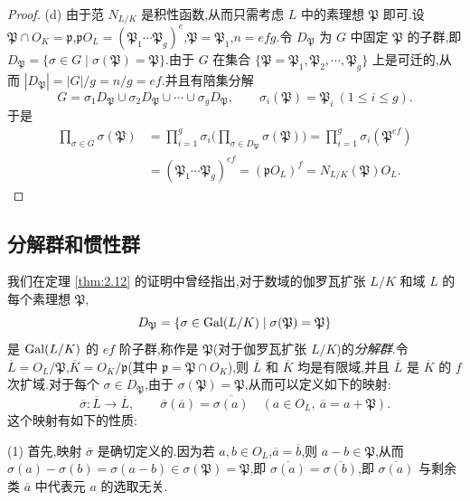 \begin{proof}
(d) 由于范 $N_{L/K}$ 是积性函数,从而只需考虑 $L$ 中的素理想 $\mathfrak{P}$ 即可.设 $\mathfrak{P}\cap O_K=\mathfrak{p}$,$\mathfrak{p}O_L=(\mathfrak{P}_1\cdots\mathfrak{P}_g)^e$,$\mathfrak{P}=\mathfrak{P}_1$,$n=efg$.令 $D_{\mathfrak{P}}$ 为 $G$ 中固定 $\mathfrak{P}$ 的子群,即 $D_{\mathfrak{P}}=\{\sigma\in G\mid\sigma(\mathfrak{P})=\mathfrak{P}\}$.由于 $G$ 在集合 $\{\mathfrak{P}=\mathfrak{P}_1,\mathfrak{P}_2,\cdots,\mathfrak{P}_g\}$ 上是可迁的,从而 $|D_{\mathfrak{P}}|=|G|/g=n/g=ef$.并且有陪集分解
\[
  G=\sigma_1D_{\mathfrak{P}}\cup\sigma_2D_{\mathfrak{P}}\cup\cdots\cup\sigma_gD_{\mathfrak{P}},\qquad
  \sigma_i(\mathfrak{P})=\mathfrak{P}_i\ (1\leqslant i\leqslant g).
\]
于是
\begin{align*}
  \prod_{\sigma\in G}\sigma(\mathfrak{P})
  &=\prod_{i=1}^{g}\sigma_i\Big(\prod_{\sigma\in D_{\mathfrak{P}}}\sigma(\mathfrak{P})\Big)
  =\prod_{i=1}^{g}\sigma_i(\mathfrak{P}^{ef})\\
  &=(\mathfrak{P}_1\cdots\mathfrak{P}_g)^{ef}=(\mathfrak{p}O_L)^f=N_{L/K}(\mathfrak{P})O_L.
\end{align*}
\end{proof}

\subsection{分解群和惯性群}\label{sec:ch2-s3-2}

我们在定理 \ref{thm:2.12} 的证明中曾经指出,对于数域的伽罗瓦扩张 $L/K$ 和域 $L$ 的每个素理想 $\mathfrak{P}$,
\[
  D_{\mathfrak{P}}=\{\sigma\in\operatorname{Gal}(L/K)\mid\sigma(\mathfrak{P})=\mathfrak{P}\}
\]
是 $\operatorname{Gal}(L/K)$ 的 $ef$ 阶子群,称作是 $\mathfrak{P}$(对于伽罗瓦扩张 $L/K$)的\emph{分解群}.令 $\overline{L}=O_L/\mathfrak{P}$,$\overline{K}=O_K/\mathfrak{p}$(其中 $\mathfrak{p}=\mathfrak{P}\cap O_K$),则 $\overline{L}$ 和 $\overline{K}$ 均是有限域,并且 $\overline{L}$ 是 $\overline{K}$ 的 $f$ 次扩域.对于每个 $\sigma\in D_{\mathfrak{P}}$,由于 $\sigma(\mathfrak{P})=\mathfrak{P}$,从而可以定义如下的映射:
\[
  \overline{\sigma}\colon\overline{L}\to\overline{L},\qquad
  \overline{\sigma}(\overline{a})=\overline{\sigma(a)}\quad (a\in O_L,\ \overline{a}=a+\mathfrak{P}).
\]
这个映射有如下的性质:

(1) 首先,映射 $\overline{\sigma}$ 是确切定义的.因为若 $a,b\in O_L$,$\overline{a}=\overline{b}$,则 $a-b\in\mathfrak{P}$,从而 $\sigma(a)-\sigma(b)=\sigma(a-b)\in\sigma(\mathfrak{P})=\mathfrak{P}$,即 $\overline{\sigma(a)}=\overline{\sigma(b)}$,即 $\overline{\sigma(a)}$ 与剩余类 $\overline{a}$ 中代表元 $a$ 的选取无关.

